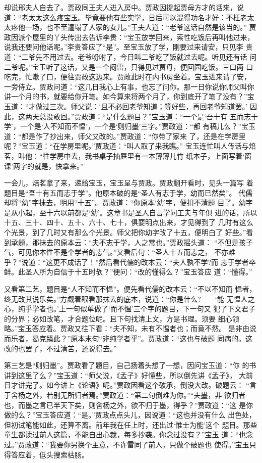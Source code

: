却说邢夫人自去了。贾政同王夫人进入房中。贾政因提起贾母方才的话来，说
道：“老太太这么疼宝玉。毕竟要他有些实学，日后可以混得功名才好：不枉老太
太疼他一场，也不至遭塌了人家的女儿。”王夫人道：“老爷这话自然是该当的。”
贾政因派个屋里的丫头传出去告诉李贵：“宝玉放学回来，索性吃饭后再叫他过来，
说我还要问他话呢。”李贵答应了“是”。至宝玉放了学，刚要过来请安，只见李
贵道：“二爷先不用过去。老爷吩咐了，今日叫二爷吃了饭就过去呢。听见还有话
问二爷呢。”宝玉听了这话，又是一个闷雷，只得见过贾母，便回园吃饭。三口两
口吃完，忙漱了口，便往贾政这边来。贾政此时在内书房坐着。宝玉进来请了安，
一旁侍立。贾政问道：“这几日我心上有事，也忘了问你。那一日你说你师父叫你
讲一个月的书，就要给你开笔。如今算来将两个月了，你到底开了笔了没有？”宝
玉道：“才做过三次。师父说：‘且不必回老爷知道；等好些，再回老爷知道罢。’
因此，这两天总没敢回。”贾政道：“是什么题目？”宝玉道：“一个是‘吾十有
五而志于学’，一个是‘人不知而不愠’，一个是‘则归墨’三字。”贾政道：“都
有稿儿么？”宝玉道：“都是作了抄出来，师父又改的。”贾政道：“你带了家来
了，还是在学房里呢？”宝玉道：“在学房里呢。”贾政道：“叫人取了来我瞧。”
宝玉连忙叫人传话与焙茗，叫他：“往学房中去，我书桌子抽屉里有一本薄薄儿竹
纸本子，上面写着‘窗课’两字的就是，快拿来。”

一会儿，焙茗拿了来，递给宝玉，宝玉呈与贾政。贾政翻开看时，见头一篇写
着题目是“吾十有五而志于学”。他原本破的是“圣人有志于学，幼而已然矣”。
代儒却将“幼”字抹去，明用“十五”。贾政道：“你原本‘幼’字，便扣不清题
目了。幼字是从小起，至十六以前都是‘幼’。这章书是圣人自言学问工夫与年俱
进的话，所以十五、三十、四十、五十、六十、七十，俱要明点出来，才见得到了
几时有这么个光景，到了几时又有那么个光景。师父把你幼字改了十五，便明白了
好些。”看到承题，那抹去的原本云：“夫不志于学，人之常也。”贾政摇头道：
“不但是孩子气，可见你本性不是个学者的志气。”又看后句：“圣人十五而志之，
不亦难乎？”说道：“这更不成话了！”然后看代儒的改本云：“夫人孰不学?而
志于学者卒鲜。此圣人所为自信于十五时欤？”便问：“改的懂得么？”宝玉答应
道：“懂得。”

又看第二艺，题目是“人不知而不愠”。便先看代儒的改本云：“不以不知而
愠者，终无改其说乐矣。”方觑着眼看那抹去的底本，说道：“你是什么?——‘能
无愠人之心，纯乎学者也。’上一句似单做了‘而不愠’三个字的题目，下一句又
犯了下文君子的分界；必如改笔，才合题位呢。且下句找清上文，方是书理。须要
细心领略。”宝玉答应着。贾政又往下看：“夫不知，未有不愠者也；而竟不然。
是非由说而乐者，曷克臻此？”原本末句“非纯学者乎”。贾政道：“这也与破题
同病的。这改的也罢了，不过清苦，还说得去。”

第三艺是“则归墨”。贾政看了题目，自己扬着头想了一想，因问宝玉道：“你
的书讲到这里了么？”宝玉道：“师父说，《孟子》好懂些，所以倒先讲《孟子》，
大前日才讲完了。如今讲上《论语》呢。”贾政因看这个破承，倒没大改。破题云：
“言于舍杨之外，若别无所归者焉。”贾政道：“第二句倒难为你。”“夫墨，非
欲归者也，而墨之言已半天下矣，则舍杨之外，欲不归于墨，得乎？”贾政道：“这
是你做的么？”宝玉答应道：“是。”贾政点点头儿，因说道：“这也并没有什么
出色处，但初试笔能如此，还算不离。前年我在任上时，还出过‘惟士为能’这个
题目。那些童生都读过前人这篇，不能自出心裁，每多抄袭。你念过没有？”宝玉
道：“也念过。”贾政道：“我要你另换个主意，不许雷同了前人，只做个破题也
使得。”宝玉只得答应着，低头搜索枯肠。

